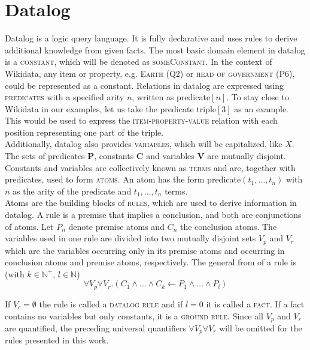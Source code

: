 \documentclass[hyperref,bachelorofscience,fleqn]{cgvpub}
\begin{document}
\section{Datalog}
Datalog is a logic query language. It is fully declarative and uses rules to derive additional knowledge from given facts. The most basic domain element in datalog is a \textsc{constant}, which will be denoted as \textsc{someConstant}. In the context of Wikidata, any item or property, e.g. \textsc{Earth} (Q2) or \textsc{head of government} (P6), could be represented as a constant. Relations in datalog are expressed using \textsc{predicates} with a specified arity \(n\), written as predicate\([n]\). To stay close to Wikidata in our examples, let us take the predicate triple\([3]\) as an example. This would be used to express the \textsc{item}-\textsc{property}-\textsc{value} relation with each position representing one part of the triple.\\
Additionally, datalog also provides \textsc{variables}, which will be capitalized, like \(X\). The sets of predicates {\bf P}, constants {\bf C} and variables {\bf V} are mutually disjoint. Constants and variables are collectively known as \textsc{terms} and are, together with predicates, used to form \textsc{atoms}. An atom has the form predicate\((t_1, \ldots , t_n)\) with \(n\) as the arity of the predicate and \(t_1,\ldots,t_n\) terms.\\
Atoms are the building blocks of \textsc{rules}, which are used to derive information in datalog. A rule is a premise that implies a conclusion, and both are conjunctions of atoms.
Let \(P_n\) denote  premise atoms and \(C_n\) the conclusion atoms. The variables used in one rule are divided into two mutually disjoint sets \(V_p\) and \(V_r\) which are the variables occurring only in its premise atoms and occurring in conclusion atoms and premise atoms, respectively. The general from of a rule is (with \(k \in \mathbb{N}^+\), \(l \in \mathbb{N}\))
\begin{equation}
\forall V_p \forall V_r.(C_1 \wedge \ldots \wedge C_k \leftarrow P_1 \wedge \ldots \wedge P_l)
\end{equation}

If \(V_c = \emptyset\) the rule is called a \textsc{datalog rule} and if \(l = 0\) it is called a \textsc{fact}. If a fact contains no variables but only constants, it is a \textsc{ground rule}. Since all \(V_p\) and \(V_r\) are  quantified, the preceding universal quantifiers \(\forall V_p \forall V_r\) will be omitted for the rules presented in this work.
\end{document}
